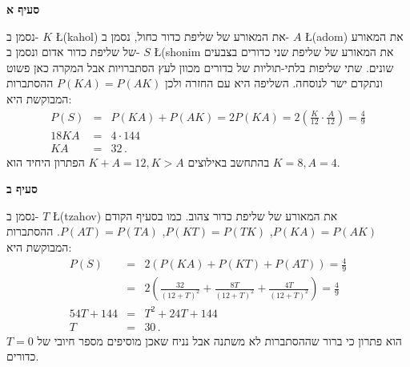 \textbf{סעיף א}

נסמן ב-%
$K$ \L{(kahol)}
את המאורע של שליפת כדור כחול, נסמן ב-%
$A$ \L{(adom)}
את המאורע של שליפת כדור אדום ונסמן ב-%
$S$ \L{(shonim}
את המאורע של שליפת שני כדורים בצבעים שונים. שתי שליפות בלתי-תוליות של כדורים מכוון לעץ הסתברויות אבל המקרה כאן פשוט ונתקדם ישר לנוסחה. השליפה היא עם החזרה ולכן 
$P(KA)=P(AK)$
ההסתברות המבוקשת היא:
\begin{eqnarray*}
P(S) &=& P(KA) + P(AK) = 2P(KA) = 2\left(\frac{K}{12}\cdot \frac{A}{12}\right)=\frac{4}{9}\\
18KA &=& 4\cdot 144\\
KA &=& 32\,.
\end{eqnarray*}
בהתחשב באילוצים
$K+A=12, K>A$
הפתרון היחיד הוא
$K=8,A=4$.

\textbf{סעיף ב}

נסמן ב-%
$T$ \L{(tzahov)}
את המאורע של שליפת כדור צהוב. כמו בסעיף הקודם 
$P(KA)=P(AK)$, $P(KT)=P(TK)$, $P(AT)=P(TA)$.
ההסתברות המבוקשת היא:
\begin{eqnarray*}
P(S) &=& 2(P(KA)+P(KT)+P(AT))=\frac{4}{9}\\
&=&2\left(\frac{32}{(12+T)^2}+\frac{8T}{(12+T)^2}+\frac{4T}{(12+T)^2}\right)=\frac{4}{9}\\
54T+144 &=& T^2 + 24T + 144\\
T&=&30\,.
\end{eqnarray*}
$T=0$
הוא פתרון כי ברור שההסתברות לא משתנה אבל נניח שאכן מוסיפים מספר חיובי של כדורים.
\begin{center}
\end{center}

